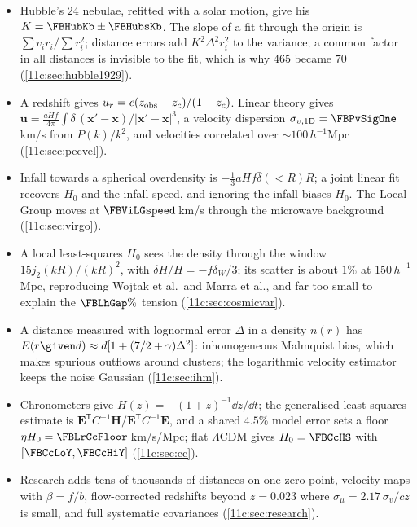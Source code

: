 \begin{recap}
\begin{itemize}[itemsep=1pt,leftmargin=1.2em]
  \item Hubble's $24$ nebulae, refitted with a solar motion, give his $K=\FBHubKb\pm\FBHubsKb$.
        The slope of a fit through the origin is $\sum v_ir_i/\sum r_i^2$; distance errors
        add $K^2\Delta^2r_i^2$ to the variance; a common factor in all distances is
        invisible to the fit, which is why $465$ became $70$ (\cref{11c:sec:hubble1929}).
  \item A redshift gives $u_r=c(z_{\rm obs}-z_c)/(1+z_c)$. Linear theory gives
        $\bm u=\frac{aHf}{4\pi}\int\delta\,(\bm x'-\bm x)/|\bm x'-\bm x|^3$, a velocity
        dispersion $\sigma_{v,1\mathrm D}=\FBPvSigOne$\,km/s from $P(k)/k^2$, and velocities
        correlated over $\sim\!100\,h^{-1}$Mpc (\cref{11c:sec:pecvel}).
  \item Infall towards a spherical overdensity is $-\frac13aHf\bar\delta(<R)R$; a joint
        linear fit recovers $H_0$ and the infall speed, and ignoring the infall biases $H_0$.
        The Local Group moves at $\FBViLGspeed$\,km/s through the microwave background
        (\cref{11c:sec:virgo}).
  \item A local least-squares $H_0$ sees the density through the window
        $15j_2(kR)/(kR)^2$, with $\delta H/H=-f\delta_W/3$; its scatter is about $1\%$ at
        $150\,h^{-1}$Mpc, reproducing Wojtak et al.\ and Marra et al., and far too small to
        explain the $\FBLhGap\%$ tension (\cref{11c:sec:cosmicvar}).
  \item A distance measured with lognormal error $\Delta$ in a density $n(r)$ has
        $E(r\given d)\approx d[1+(7/2+\gamma)\Delta^2]$: inhomogeneous Malmquist bias,
        which makes spurious outflows around clusters; the logarithmic velocity estimator
        keeps the noise Gaussian (\cref{11c:sec:ihm}).
  \item Chronometers give $H(z)=-(1+z)^{-1}\dd z/\dd t$; the generalised least-squares
        estimate is $\bm E^{\mathsf T}C^{-1}\bm H/\bm E^{\mathsf T}C^{-1}\bm E$, and a shared
        $4.5\%$ model error sets a floor $\eta H_0=\FBLrCcFloor$\,km/s/Mpc; flat $\Lambda$CDM gives
        $H_0=\FBCcHS$ with $[\FBCcLoY,\FBCcHiY]$ (\cref{11c:sec:cc}).
  \item Research adds tens of thousands of distances on one zero point, velocity
        maps with $\beta=f/b$, flow-corrected redshifts beyond $z=0.023$ where
        $\sigma_\mu=2.17\,\sigma_v/cz$ is small, and full systematic covariances
        (\cref{11c:sec:research}).
\end{itemize}
\end{recap}


